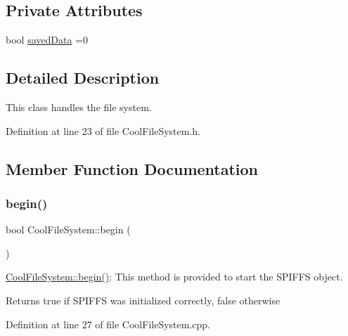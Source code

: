 \subsection*{Private Attributes}
\begin{DoxyCompactItemize}
\item 
bool \hyperlink{class_cool_file_system_ad398e0c5c41a0c88acdf5d672aa71351}{saved\+Data} =0
\end{DoxyCompactItemize}


\subsection{Detailed Description}
This class handles the file system. 

Definition at line 23 of file Cool\+File\+System.\+h.



\subsection{Member Function Documentation}
\mbox{\label{class_cool_file_system_a6ba6f666ed4c530174f8569d2c636748}} 
\subsubsection{\texorpdfstring{begin()}{begin()}}
{\footnotesize\ttfamily bool Cool\+File\+System\+::begin (\begin{DoxyParamCaption}{ }\end{DoxyParamCaption})}

\hyperlink{class_cool_file_system_a6ba6f666ed4c530174f8569d2c636748}{Cool\+File\+System\+::begin()}\+: This method is provided to start the S\+P\+I\+F\+FS object.

\begin{DoxyReturn}{Returns}
true if S\+P\+I\+F\+FS was initialized correctly, false otherwise 
\end{DoxyReturn}


Definition at line 27 of file Cool\+File\+System.\+cpp.


